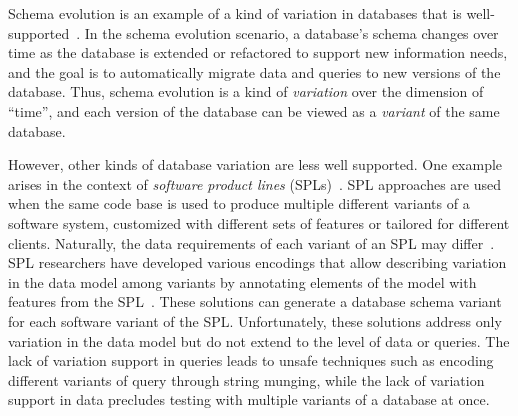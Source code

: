 
Schema evolution is an example of a kind of variation in databases that is
well-supported~\cite{SchEvolRA90McKenzie, schVersioning97Castro,
tempSchEvol91Ariav, tsql95Snodgrass, prima08Moon}.
%
In the schema evolution scenario, a database's schema changes over time as the
database is extended or refactored to support new information needs, and the
goal is to automatically migrate data and queries to new versions of the
database. Thus, schema evolution is a kind of \emph{variation} over the
dimension of ``time'', and each version of the database can be viewed as a
\emph{variant} of the same database.
%


However, other kinds of database variation are less well supported. One example
arises in the context of \emph{software product lines} (SPLs)~\cite{fospl}. 
SPL approaches are used when the same code base is used to produce multiple different
variants of a software system, customized with different sets of features or
tailored for different clients. Naturally, the data requirements of each
variant of an SPL may differ~\cite{skrhas09DBIS}.
%
SPL researchers have developed various encodings that allow describing
variation in the data model among variants by annotating elements of the model
with features from the SPL~\cite{skrhas09DBIS,slrs12CAiSE,ad11varDataModel}.
These solutions can generate a database schema variant for each software
variant of the SPL. 
%
Unfortunately, these solutions address only variation in the data model but do not
extend to the level of data or queries. The lack of variation support in
queries leads to unsafe techniques such as encoding different variants of query
through string munging, while the lack of variation support in data precludes
testing with multiple variants of a database at once.

